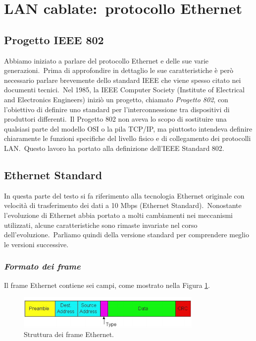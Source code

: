 \section{LAN cablate:\ protocollo Ethernet}

\subsection{Progetto IEEE 802}

Abbiamo iniziato a parlare del protocollo Ethernet e delle sue varie generazioni.\
Prima di approfondire in dettaglio le sue caratteristiche è però necessario parlare brevemente dello standard IEEE che viene spesso citato nei documenti tecnici.\
Nel 1985, la IEEE Computer Society (Institute of Electrical and Electronics Engineers) iniziò un progetto, chiamato \emph{Progetto 802}, con l'obiettivo di definire uno standard per l'interconnessione tra dispositivi di produttori differenti.\
Il Progetto 802 non aveva lo scopo di sostituire una qualsiasi parte del modello OSI o la pila TCP/IP, ma piuttosto intendeva definire chiaramente le funzioni specifiche del livello fisico e di collegamento dei protocolli LAN.\
Questo lavoro ha portato alla definizione dell'IEEE Standard 802.

\subsection{Ethernet Standard}

In questa parte del testo si fa riferimento alla tecnologia Ethernet originale con velocità di trasferimento dei dati a 10 Mbps (Ethernet Standard).\
Nonostante l'evoluzione di Ethernet abbia portato a molti cambiamenti nei meccanismi utilizzati, alcune caratteristiche sono rimaste invariate nel corso dell'evoluzione.\
Parliamo quindi della versione standard per comprendere meglio le versioni successive.

\subsubsection{\emph{Formato dei frame}}

Il frame Ethernet contiene sei campi, come mostrato nella Figura \ref{fig:Frame}.

\begin{figure}[H]
    \centering
    \includegraphics[width=0.8\textwidth]{immagini/Frame_Ethernet.png}
    \caption{Struttura dei frame Ethernet.}
    \label{fig:Frame}
\end{figure}

